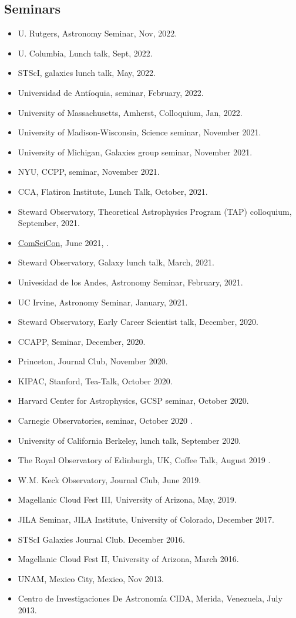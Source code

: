 \documentclass[UTF8]{article}
\begin{document}
\subsection*{Seminars}
\begin{itemize}
  \setlength\itemsep{0.0em}
  \renewcommand\labelitemi{$\cdot$}
\item U. Rutgers, Astronomy Seminar, Nov, 2022. \dag
\item U. Columbia, Lunch talk, Sept, 2022. \dag
\item STScI, galaxies lunch talk, May, 2022. \dag
\item Universidad de Ant\'ioquia, seminar, February, 2022. \dag 
\item University of Massachusetts, Amherst, Colloquium, Jan, 2022. \dag
\item University of Madison-Wisconsin, Science seminar, November 2021.\dag
\item University of Michigan, Galaxies group seminar, November 2021.\dag
\item NYU, CCPP, seminar, November 2021.\dag 
\item CCA, Flatiron Institute, Lunch Talk, October, 2021.
\item Steward Observatory, Theoretical Astrophysics Program (TAP) colloquium, September, 2021.\dag
\item \href{https://comscicon.com/comscicon-en-espa%C3%B1ol-2021}{ComSciCon}, June 2021, \dag. 
\item Steward Observatory, Galaxy lunch talk, March, 2021.
\item Univesidad de los Andes, Astronomy Seminar, February, 2021. 
\item UC Irvine, Astronomy Seminar, January, 2021. \dag
\item Steward Observatory, Early Career Scientist talk, December, 2020. \dag
\item CCAPP, Seminar, December, 2020. \dag
\item Princeton, Journal Club, November 2020. \dag
\item KIPAC, Stanford, Tea-Talk, October 2020.
\item Harvard Center for Astrophysics, GCSP seminar, October 2020.
\item Carnegie Observatories, seminar, October 2020 \dag.
\item University of California Berkeley, lunch talk, September 2020. 
\item The Royal Observatory of Edinburgh, UK, Coffee Talk, August 2019 \dag.
\item W.M. Keck Observatory, Journal Club, June 2019.
\item Magellanic Cloud Fest III, University of Arizona, May, 2019.
\item JILA Seminar, JILA Institute, University of Colorado, December 2017.
\item STScI Galaxies Journal Club. December 2016.
\item Magellanic Cloud Fest II, University of Arizona, March 2016.
\item UNAM, Mexico City, Mexico, Nov 2013. 
\item Centro de Investigaciones De Astronom\'ia CIDA, Merida, Venezuela, July 2013.
\end{itemize}
\end{document}
